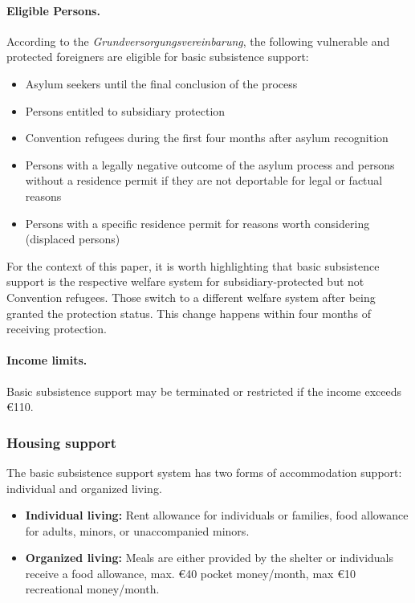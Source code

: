 \paragraph{Eligible Persons.}
According to the \textit{Grundversorgungsvereinbarung}, the following vulnerable and protected foreigners are eligible for basic subsistence support:
\begin{itemize}
    \item Asylum seekers until the final conclusion of the process
    \item Persons entitled to subsidiary protection
    \item Convention refugees during the first four months after asylum recognition
    \item Persons with a legally negative outcome of the asylum process and persons without a residence permit if they are not deportable for legal or factual reasons
    \item Persons with a specific residence permit for reasons worth considering (displaced persons)
\end{itemize}

For the context of this paper, it is worth highlighting that basic subsistence support is the respective welfare system for subsidiary-protected but not Convention refugees. Those switch to a different welfare system after being granted the protection status. This change happens within four months of receiving protection.

\paragraph{Income limits.}
Basic subsistence support may be terminated or restricted if the income exceeds €110. 

\subsubsection{Housing support}
The basic subsistence support system has two forms of accommodation support: individual and organized living.

\begin{itemize}
    \item \textbf{Individual living:} Rent allowance for individuals or families, food allowance for adults, minors, or unaccompanied minors.
    \item \textbf{Organized living:} Meals are either provided by the shelter or individuals receive a food allowance, max. €40 pocket money/month, max €10 recreational money/month.
\end{itemize}

